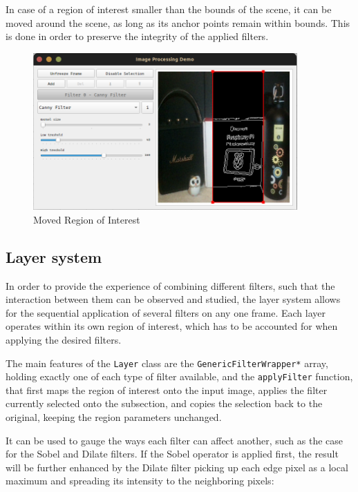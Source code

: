 In case of a region of interest smaller than the bounds of the scene, it can be moved around the scene, as
long as its anchor points remain within bounds. This is done in order to preserve the integrity of the applied
filters.

\begin{figure}[H]
	\includegraphics[width=0.9\textwidth, height=0.45\textwidth]{resources/Roi_2.png}
	\caption{Moved Region of Interest}
\end{figure}

\subsection{Layer system}

In order to provide the experience of combining different filters, such that the interaction between them can
be observed and studied, the layer system allows for the sequential application of several filters on any one
frame. Each layer operates within its own region of interest, which has to be accounted for when applying the
desired filters.

The main features of the \verb|Layer| class are the \verb|GenericFilterWrapper*| array, holding exactly one
of each type of filter available, and the \verb|applyFilter| function, that first maps the region of interest
onto the input image, applies the filter currently selected onto the subsection, and copies the selection back
to the original, keeping the region parameters unchanged.

It can be used to gauge the ways each filter can affect another, such as the case for the Sobel and Dilate
filters. If the Sobel operator is applied first, the result will be further enhanced by the Dilate filter
picking up each edge pixel as a local maximum and spreading its intensity to the neighboring pixels:

